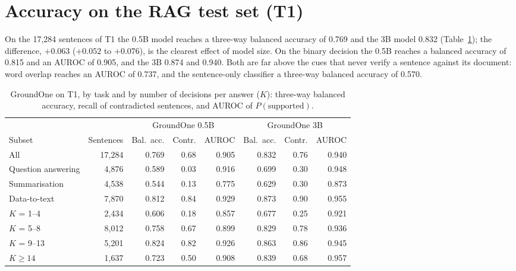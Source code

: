 \section{Accuracy on the RAG test set (T1)}
\label{sec:results-t1}

On the 17{,}284 sentences of T1 the 0.5B model reaches a three-way balanced accuracy of 0.769 and the 3B model 0.832
(Table~\ref{tab:results-t1}); the difference, $+0.063$ ($+0.052$ to $+0.076$), is the clearest effect of model size. On
the binary decision the 0.5B reaches a balanced accuracy of 0.815 and an AUROC of 0.905, and the 3B 0.874 and 0.940.
Both are far above the cues that never verify a sentence against its document: word overlap reaches an AUROC of 0.737,
and the sentence-only classifier a three-way balanced accuracy of 0.570.

\begin{table}[htbp]
\centering
\caption{GroundOne on T1, by task and by number of decisions per answer ($K$): three-way balanced accuracy, recall of
contradicted sentences, and AUROC of $P(\text{supported})$.}
\label{tab:results-t1}
\small
\begin{adjustbox}{max width=\textwidth}
\begin{tabular}{@{}lrrrrrrr@{}}
\toprule
 & & \multicolumn{3}{c}{GroundOne 0.5B} & \multicolumn{3}{c}{GroundOne 3B} \\
\cmidrule(lr){3-5}\cmidrule(l){6-8}
Subset & Sentences & Bal.\ acc. & Contr. & AUROC & Bal.\ acc. & Contr. & AUROC \\
\midrule
All & 17{,}284 & 0.769 & 0.68 & 0.905 & 0.832 & 0.76 & 0.940 \\
\midrule
Question answering & 4{,}876 & 0.589 & 0.03 & 0.916 & 0.699 & 0.30 & 0.948 \\
Summarisation & 4{,}538 & 0.544 & 0.13 & 0.775 & 0.629 & 0.30 & 0.873 \\
Data-to-text & 7{,}870 & 0.812 & 0.84 & 0.929 & 0.873 & 0.90 & 0.955 \\
\midrule
$K$ = 1--4 & 2{,}434 & 0.606 & 0.18 & 0.857 & 0.677 & 0.25 & 0.921 \\
$K$ = 5--8 & 8{,}012 & 0.758 & 0.67 & 0.899 & 0.829 & 0.78 & 0.936 \\
$K$ = 9--13 & 5{,}201 & 0.824 & 0.82 & 0.926 & 0.863 & 0.86 & 0.945 \\
$K \geq 14$ & 1{,}637 & 0.723 & 0.50 & 0.908 & 0.839 & 0.68 & 0.957 \\
\bottomrule
\end{tabular}
\end{adjustbox}
\end{table}

